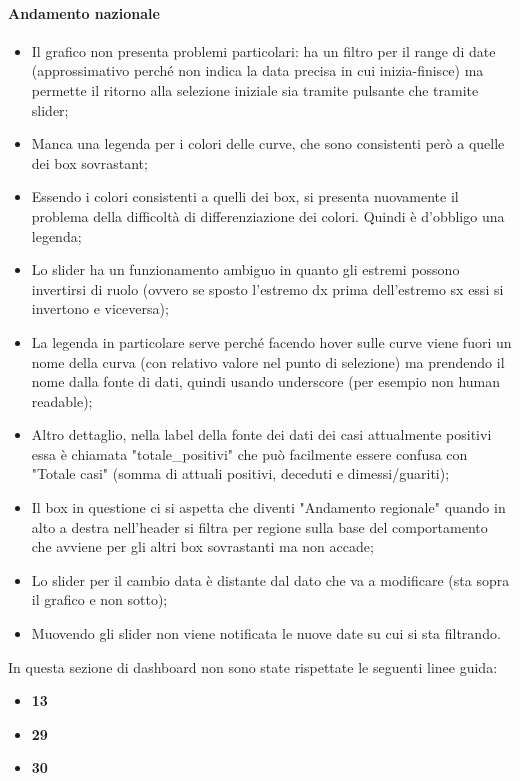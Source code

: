 \paragraph{Andamento nazionale}
\begin{itemize}
    \item Il grafico non presenta problemi particolari: ha un filtro per il range di date (approssimativo perché non indica la data precisa in cui inizia-finisce) ma permette il ritorno alla selezione iniziale sia tramite pulsante che tramite slider;
    \item Manca una legenda per i colori delle curve, che sono consistenti però a quelle dei box sovrastant;
    \item Essendo i colori consistenti a quelli dei box, si presenta nuovamente il problema della difficoltà di differenziazione dei colori. Quindi è d'obbligo una legenda;
    \item Lo slider ha un funzionamento ambiguo in quanto gli estremi possono invertirsi di ruolo (ovvero se sposto l'estremo dx prima dell'estremo sx essi si invertono e viceversa);
    \item La legenda in particolare serve perché facendo hover sulle curve viene fuori un nome della curva (con relativo valore nel punto di selezione) ma prendendo il nome dalla fonte di dati, quindi usando underscore (per esempio non human readable);
    \item Altro dettaglio, nella label della fonte dei dati dei casi attualmente positivi essa è chiamata "totale\_positivi" che può facilmente essere confusa con "Totale casi" (somma di attuali positivi, deceduti e dimessi/guariti);
    \item Il box in questione ci si aspetta che diventi "Andamento regionale" quando in alto a destra nell'header si filtra per regione sulla base del comportamento che avviene per gli altri box sovrastanti ma non accade;
    \item Lo slider per il cambio data è distante dal dato che va a modificare (sta sopra il grafico e non sotto);
    \item Muovendo gli slider non viene notificata le nuove date su cui si sta filtrando.
\end{itemize}
In questa sezione di dashboard non sono state rispettate le seguenti linee guida:
\begin{itemize}
    \item \textbf{13}
    \item \textbf{29}
    \item \textbf{30}
\end{itemize}

